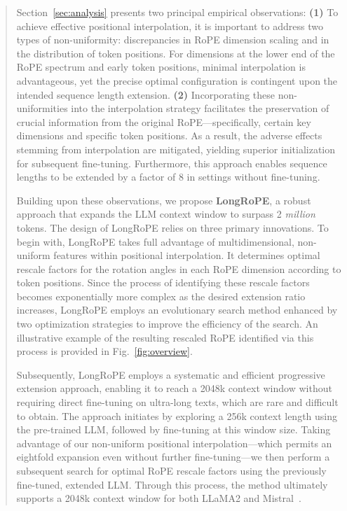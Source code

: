 \begin{abstract}
Section~\ref{sec:analysis} presents two principal empirical observations: \textbf{(1)} To achieve effective positional interpolation, it is important to address two types of non-uniformity: discrepancies in RoPE dimension scaling and in the distribution of token positions. For dimensions at the lower end of the RoPE spectrum and early token positions, minimal interpolation is advantageous, yet the precise optimal configuration is contingent upon the intended sequence length extension.  
\textbf{(2)} Incorporating these non-uniformities into the interpolation strategy facilitates the preservation of crucial information from the original RoPE—specifically, certain key dimensions and specific token positions. As a result, the adverse effects stemming from interpolation are mitigated, yielding superior initialization for subsequent fine-tuning. Furthermore, this approach enables sequence lengths to be extended by a factor of 8 in settings without fine-tuning.

Building upon these observations, we propose \textbf{LongRoPE}, a robust approach that expands the LLM context window to surpass 2 \emph{million} tokens. The design of LongRoPE relies on three primary innovations. To begin with, {LongRoPE} takes full advantage of multidimensional, non-uniform features within positional interpolation. It determines optimal rescale factors for the rotation angles in each RoPE dimension according to token positions. Since the process of identifying these rescale factors becomes exponentially more complex as the desired extension ratio increases, {LongRoPE} employs an evolutionary search method enhanced by two optimization strategies to improve the efficiency of the search. An illustrative example of the resulting rescaled RoPE identified via this process is provided in Fig.~\ref{fig:overview}.

Subsequently, {LongRoPE} employs a systematic and efficient progressive extension approach, enabling it to reach a 2048k context window without requiring direct fine-tuning on ultra-long texts, which are rare and difficult to obtain. The approach initiates by exploring a 256k context length using the pre-trained LLM, followed by fine-tuning at this window size. Taking advantage of our non-uniform positional interpolation—which permits an eightfold expansion even without further fine-tuning—we then perform a subsequent search for optimal RoPE rescale factors using the previously fine-tuned, extended LLM. Through this process, the method ultimately supports a 2048k context window for both LLaMA2 and Mistral~\cite{mistral}.


\end{abstract}
